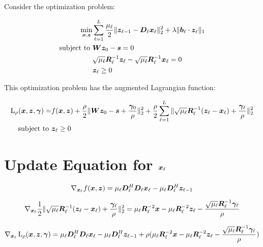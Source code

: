 \documentclass{article}
\begin{document}
Consider the optimization problem:

\begin{equation}
\begin{aligned}
\min_{\bm{x},\bm{z}} & \sum_{\ell = 1}^{L} \frac{\mu_{\ell}}{2}\|\bm{z}_{\ell - 1} -\bm{D}_{\ell}\bm{x}_{\ell}\|_2^2 + \lambda\|\bm{b}_{\ell} \cdot \bm{z}_{\ell}\|_1 \\
\text{subject to } & \bm{W}\bm{z}_0 - \bm{s} = 0 \\
                   & \sqrt{\mu_{\ell}}\bm{R}_{\ell}^{-1}\bm{z}_{\ell} - \sqrt{\mu_{\ell}}\bm{R}_{\ell}^{-1}\bm{x}_{\ell} = 0 \\
                   &  \bm{z}_{\ell} \geq 0
\end{aligned}
\end{equation}

This optimization problem has the augmented Lagrangian function:

\begin{equation}
\begin{aligned}
\operatorname{L}_{\rho}(\bm{x},\bm{z},\bm{\gamma}) = & f(\bm{x},\bm{z}) + \frac{\rho}{2}\|\bm{W}\bm{z}_0 - \bm{s} + \frac{\bm{\gamma}_0}{\rho}\|_2^2 + \frac{\rho}{2}\sum_{\ell = 1}^L \|\sqrt{\mu_{\ell}}\bm{R}_{\ell}^{-1}(\bm{z}_{\ell} - \bm{x}_{\ell}) + \frac{\bm{\gamma}_{\ell}}{\rho}\|_2^2 \\
\text{subject to }                          & \bm{z}_{\ell} \geq 0
\end{aligned}
\end{equation}

\section{Update Equation for $\bm{x}_{\ell}$}

\begin{equation}
\nabla_{\bm{x}_{\ell}} f(\bm{x},\bm{z}) = \mu_{\ell}\bm{D}_{\ell}^H\bm{D}_{\ell}\bm{x}_{\ell} - \mu_{\ell}\bm{D}_{\ell}^H\bm{z}_{\ell - 1}
\end{equation}

\begin{equation}
\nabla_{\bm{x}_{\ell}} \frac{1}{2}\|\sqrt{\mu_{\ell}}\bm{R}_{\ell}^{-1}(\bm{z}_{\ell} - \bm{x}_{\ell}) + \frac{\bm{\gamma}_{\ell}}{\rho}\|_2^2 = \mu_{\ell}\bm{R}_{\ell}^{-2}\bm{x} - \mu_{\ell}\bm{R}_{\ell}^{-2}\bm{z}_{\ell} - \frac{\sqrt{\mu_{\ell}}\bm{R}_{\ell}^{-1}\bm{\gamma}_{\ell}}{\rho}
\end{equation}

\begin{equation}
\nabla_{\bm{x}_{\ell}} \operatorname{L}_{\rho}(\bm{x},\bm{z},\bm{\gamma}) = \mu_{\ell}\bm{D}_{\ell}^H\bm{D}_{\ell}\bm{x}_{\ell} - \mu_{\ell}\bm{D}_{\ell}^H\bm{z}_{\ell - 1} + \rho(\mu_{\ell}\bm{R}_{\ell}^{-2}\bm{x} - \mu_{\ell}\bm{R}_{\ell}^{-2}\bm{z}_{\ell} - \frac{\sqrt{\mu_{\ell}}\bm{R}_{\ell}^{-1}\bm{\gamma}_{\ell}}{\rho})
\end{equation}
\end{document}
